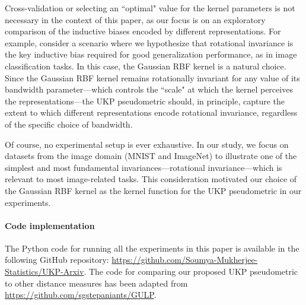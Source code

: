 \documentclass[11pt]{article}
\newcommand{\metricstname}{UKP }
\theoremstyle{plain}
\begin{document}
Cross-validation or selecting an ``optimal" value for the kernel parameters is not necessary in the context of this paper, as our focus is on an exploratory comparison of the inductive biases encoded by different representations. For example, consider a scenario where we hypothesize that rotational invariance is the key inductive bias required for good generalization performance, as in image classification tasks. In this case, the Gaussian RBF kernel is a natural choice. Since the Gaussian RBF kernel remains rotationally invariant for any value of its bandwidth parameter—which controls the ``scale" at which the kernel perceives the representations—the \metricstname pseudometric should, in principle, capture the extent to which different representations encode rotational invariance, regardless of the specific choice of bandwidth.

Of course, no experimental setup is ever exhaustive. In our study, we focus on datasets from the image domain (MNIST and ImageNet) to illustrate one of the simplest and most fundamental invariances—rotational invariance—which is relevant to most image-related tasks. This consideration motivated our choice of the Gaussian RBF kernel as the kernel function for the \metricstname pseudometric in our experiments.

\paragraph{Code implementation} The Python code for running all the experiments in this paper is available in the following GitHub repository: \url{https://github.com/Soumya-Mukherjee-Statistics/UKP-Arxiv}. The code for comparing our proposed \metricstname pseudometric to other distance measures has been adapted from \url{https://github.com/sgstepaniants/GULP}.  
\end{document}
